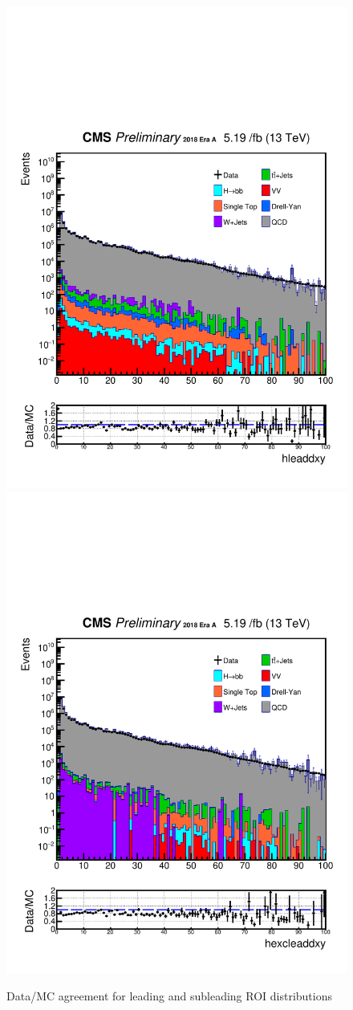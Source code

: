 \begin{figure}[h!]
  \caption{Data/MC agreement for leading and subleading ROI distributions}
  \label{fig:DataMCscore2}
  \centering
  \includegraphics[width=0.57\linewidth]{figs/Data_log_Oct6ANVars_MS-15_ctauS-10_hleaddxy.pdf}
  \includegraphics[width=0.57\linewidth]{figs/Data_log_Oct6ANVars_MS-15_ctauS-10_hexcleaddxy.pdf}

\end{figure}


